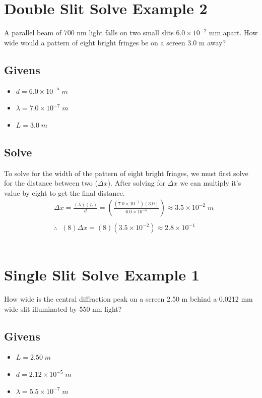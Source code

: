 \documentclass{article}
\begin{document}
\section{Double Slit Solve Example 2}
A parallel beam of 700 nm light falls on two small slits $6.0 \times 10^{-2}$ mm apart. How wide would a pattern of eight bright fringes be on a screen 3.0 m away?
\subsection*{Givens}
\begin{itemize}
    \item $d = 6.0 \times 10^{-5}\;m$
    \item $\lambda = 7.0 \times 10^{-7}\;m$
    \item $L = 3.0\;m$
\end{itemize}\leavevmode
\vspace{2cm}
\subsection*{Solve}
To solve for the width of the pattern of eight bright fringes, we must first solve for the distance between two ($\Delta x$). After solving for $\Delta x$ we can multiply it's value by eight to get the final distance.\\
\begin{align*}
     & \Delta x = \frac{(\lambda)(L)}{d} = \left(\frac{(7.0 \times 10^{-7})(3.0)}{6.0 \times 10^{-5}}\right) \approx 3.5 \times 10^{-2}\;m \\\\
     & \therefore\;\;(8)\Delta x = (8)(3.5 \times 10^{-2}) \approx 2.8 \times 10^{-1}
\end{align*}\leavevmode\\

\section{Single Slit Solve Example 1}
How wide is the central diffraction peak on a screen 2.50 m behind a 0.0212 mm wide slit illuminated by 550 nm light?
\subsection*{Givens}
\begin{itemize}
    \item $L = 2.50\;m$
    \item $d = 2.12 \times 10^{-5}\;m$
    \item $\lambda = 5.5 \times 10^{-7}\;m$
\end{itemize}\leavevmode
\end{document}
